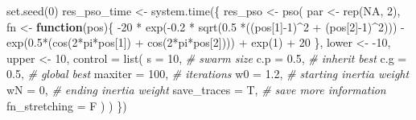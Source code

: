 \documentclass[
  oneside]{book}
\newenvironment{Shaded}{\begin{snugshade}}{\end{snugshade}}
\newcommand{\AttributeTok}[1]{\textcolor[rgb]{0.77,0.63,0.00}{#1}}
\newcommand{\CommentTok}[1]{\textcolor[rgb]{0.56,0.35,0.01}{\textit{#1}}}
\newcommand{\ConstantTok}[1]{\textcolor[rgb]{0.00,0.00,0.00}{#1}}
\newcommand{\ControlFlowTok}[1]{\textcolor[rgb]{0.13,0.29,0.53}{\textbf{#1}}}
\newcommand{\DecValTok}[1]{\textcolor[rgb]{0.00,0.00,0.81}{#1}}
\newcommand{\FloatTok}[1]{\textcolor[rgb]{0.00,0.00,0.81}{#1}}
\newcommand{\FunctionTok}[1]{\textcolor[rgb]{0.00,0.00,0.00}{#1}}
\newcommand{\NormalTok}[1]{#1}
\newcommand{\OtherTok}[1]{\textcolor[rgb]{0.56,0.35,0.01}{#1}}
\newcommand{\SpecialCharTok}[1]{\textcolor[rgb]{0.00,0.00,0.00}{#1}}
\begin{document}
\begin{Shaded}
\begin{Highlighting}[]
\FunctionTok{set.seed}\NormalTok{(}\DecValTok{0}\NormalTok{)}
\NormalTok{res\_pso\_time }\OtherTok{\textless{}{-}} \FunctionTok{system.time}\NormalTok{(\{}
\NormalTok{  res\_pso }\OtherTok{\textless{}{-}} \FunctionTok{pso}\NormalTok{(}
\NormalTok{    par }\OtherTok{\textless{}{-}} \FunctionTok{rep}\NormalTok{(}\ConstantTok{NA}\NormalTok{, }\DecValTok{2}\NormalTok{),}
\NormalTok{    fn }\OtherTok{\textless{}{-}} \ControlFlowTok{function}\NormalTok{(pos)\{}
      \SpecialCharTok{{-}}\DecValTok{20} \SpecialCharTok{*} \FunctionTok{exp}\NormalTok{(}\SpecialCharTok{{-}}\FloatTok{0.2} \SpecialCharTok{*} \FunctionTok{sqrt}\NormalTok{(}\FloatTok{0.5} \SpecialCharTok{*}\NormalTok{((pos[}\DecValTok{1}\NormalTok{]}\SpecialCharTok{{-}}\DecValTok{1}\NormalTok{)}\SpecialCharTok{\^{}}\DecValTok{2} \SpecialCharTok{+}\NormalTok{ (pos[}\DecValTok{2}\NormalTok{]}\SpecialCharTok{{-}}\DecValTok{1}\NormalTok{)}\SpecialCharTok{\^{}}\DecValTok{2}\NormalTok{))) }\SpecialCharTok{{-}} 
      \FunctionTok{exp}\NormalTok{(}\FloatTok{0.5}\SpecialCharTok{*}\NormalTok{(}\FunctionTok{cos}\NormalTok{(}\DecValTok{2}\SpecialCharTok{*}\NormalTok{pi}\SpecialCharTok{*}\NormalTok{pos[}\DecValTok{1}\NormalTok{]) }\SpecialCharTok{+} \FunctionTok{cos}\NormalTok{(}\DecValTok{2}\SpecialCharTok{*}\NormalTok{pi}\SpecialCharTok{*}\NormalTok{pos[}\DecValTok{2}\NormalTok{]))) }\SpecialCharTok{+} 
      \FunctionTok{exp}\NormalTok{(}\DecValTok{1}\NormalTok{) }\SpecialCharTok{+} \DecValTok{20}
\NormalTok{    \},}
\NormalTok{    lower }\OtherTok{\textless{}{-}} \SpecialCharTok{{-}}\DecValTok{10}\NormalTok{,}
\NormalTok{    upper }\OtherTok{\textless{}{-}} \DecValTok{10}\NormalTok{,}
    \AttributeTok{control =} \FunctionTok{list}\NormalTok{(}
      \AttributeTok{s =} \DecValTok{10}\NormalTok{, }\CommentTok{\# swarm size}
      \AttributeTok{c.p =} \FloatTok{0.5}\NormalTok{, }\CommentTok{\# inherit best}
      \AttributeTok{c.g =} \FloatTok{0.5}\NormalTok{, }\CommentTok{\# global best}
      \AttributeTok{maxiter =} \DecValTok{100}\NormalTok{, }\CommentTok{\# iterations}
      \AttributeTok{w0 =} \FloatTok{1.2}\NormalTok{, }\CommentTok{\# starting inertia weight}
      \AttributeTok{wN =} \DecValTok{0}\NormalTok{, }\CommentTok{\# ending inertia weight}
      \AttributeTok{save\_traces =}\NormalTok{ T, }\CommentTok{\# save more information}
      \AttributeTok{fn\_stretching =}\NormalTok{ F}
\NormalTok{    )}
\NormalTok{  )}
\NormalTok{\})}


\end{Highlighting}
\end{Shaded}
\end{document}
